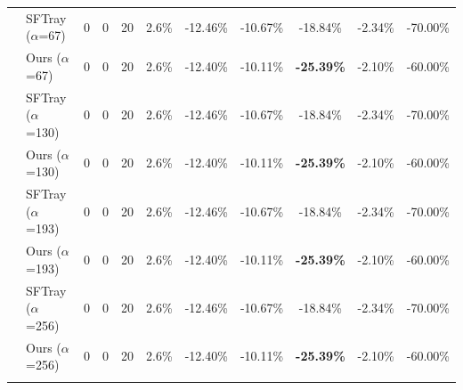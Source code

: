 \begin{table}[t]
{\begin{tabular}{ll|cccc|ccc|cc}
 & SFTray ($\alpha$=67) & 0 & 0 & 20 & 2.6\% & -12.46\% & -10.67\% & -18.84\% & -2.34\% & -70.00\% \\

 & Ours ($\alpha$=67) & 0 & 0 & 20 & 2.6\% & -12.40\% & -10.11\% & \textbf{-25.39\%} & -2.10\% & -60.00\% \\

\addlinespace[0.3em]

 & SFTray ($\alpha$=130) & 0 & 0 & 20 & 2.6\% & -12.46\% & -10.67\% & -18.84\% & -2.34\% & -70.00\% \\

 & Ours ($\alpha$=130) & 0 & 0 & 20 & 2.6\% & -12.40\% & -10.11\% & \textbf{-25.39\%} & -2.10\% & -60.00\% \\

\addlinespace[0.3em]

 & SFTray ($\alpha$=193) & 0 & 0 & 20 & 2.6\% & -12.46\% & -10.67\% & -18.84\% & -2.34\% & -70.00\% \\

 & Ours ($\alpha$=193) & 0 & 0 & 20 & 2.6\% & -12.40\% & -10.11\% & \textbf{-25.39\%} & -2.10\% & -60.00\% \\

\addlinespace[0.3em]

 & SFTray ($\alpha$=256) & 0 & 0 & 20 & 2.6\% & -12.46\% & -10.67\% & -18.84\% & -2.34\% & -70.00\% \\

 & Ours ($\alpha$=256) & 0 & 0 & 20 & 2.6\% & -12.40\% & -10.11\% & \textbf{-25.39\%} & -2.10\% & -60.00\% \\

\addlinespace[0.3em]

\midrule

\bottomrule

\end{tabular}

}

\end{table}


